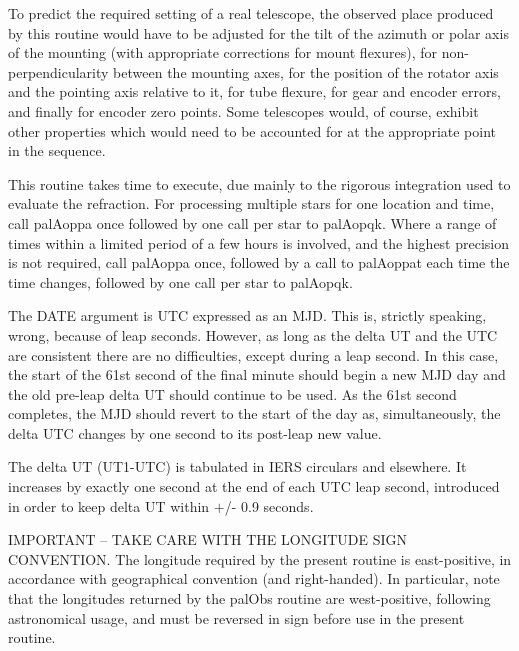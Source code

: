 \documentclass[twoside,11pt]{article}
\renewcommand{\_}{\texttt{\symbol{95}}}
\newcommand{\sstitem}{\item}
\newcommand{\sstitem}{\item}
\begin{document}
{{{         \sstitem
         To predict the required setting of a real telescope, the
           observed place produced by this routine would have to be
           adjusted for the tilt of the azimuth or polar axis of the
           mounting (with appropriate corrections for mount flexures),
           for non-perpendicularity between the mounting axes, for the
           position of the rotator axis and the pointing axis relative
           to it, for tube flexure, for gear and encoder errors, and
           finally for encoder zero points.  Some telescopes would, of
           course, exhibit other properties which would need to be
           accounted for at the appropriate point in the sequence.

         \sstitem
         This routine takes time to execute, due mainly to the
           rigorous integration used to evaluate the refraction.
           For processing multiple stars for one location and time,
           call palAoppa once followed by one call per star to palAopqk.
           Where a range of times within a limited period of a few hours
           is involved, and the highest precision is not required, call
           palAoppa once, followed by a call to palAoppat each time the
           time changes, followed by one call per star to palAopqk.

         \sstitem
         The DATE argument is UTC expressed as an MJD.  This is,
           strictly speaking, wrong, because of leap seconds.  However,
           as long as the delta UT and the UTC are consistent there
           are no difficulties, except during a leap second.  In this
           case, the start of the 61st second of the final minute should
           begin a new MJD day and the old pre-leap delta UT should
           continue to be used.  As the 61st second completes, the MJD
           should revert to the start of the day as, simultaneously,
           the delta UTC changes by one second to its post-leap new value.

         \sstitem
         The delta UT (UT1-UTC) is tabulated in IERS circulars and
           elsewhere.  It increases by exactly one second at the end of
           each UTC leap second, introduced in order to keep delta UT
           within $+$/- 0.9 seconds.

         \sstitem
         IMPORTANT -- TAKE CARE WITH THE LONGITUDE SIGN CONVENTION.
           The longitude required by the present routine is east-positive,
           in accordance with geographical convention (and right-handed).
           In particular, note that the longitudes returned by the
           palObs routine are west-positive, following astronomical
           usage, and must be reversed in sign before use in the present
           routine.

}}}
\end{document}
